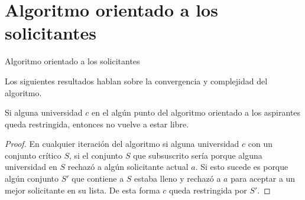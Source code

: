 \newpage

\section{Algoritmo orientado a los solicitantes}

\IncMargin{1em}
\begin{Algoritmo}[H]

\BlankLine
{}
\caption{Algoritmo orientado a los solicitantes}
\end{Algoritmo}
\DecMargin{1em}

Los siguientes resultados hablan sobre la convergencia y complejidad del algoritmo.

\begin{lem}
\label{lemaAOA1}
Si alguna universidad $c$ en el algún punto del algoritmo orientado a los aspirantes queda restringida, entonces no vuelve a estar libre.
\end{lem}
\begin{proof}
En cualquier iteración del algoritmo si alguna universidad $c$ con un conjunto crítico $S$, si el conjunto $S$ que subsuscrito sería porque alguna universidad en $S$ rechazó a algún solicitante actual $a$. Si esto sucede es porque algún conjunto $S'$
 que contiene a $S$ estaba lleno y rechazó a $a$ para aceptar a un mejor solicitante en su lista. De esta forma $c$ queda restringida por $S'$.
\end{proof}


